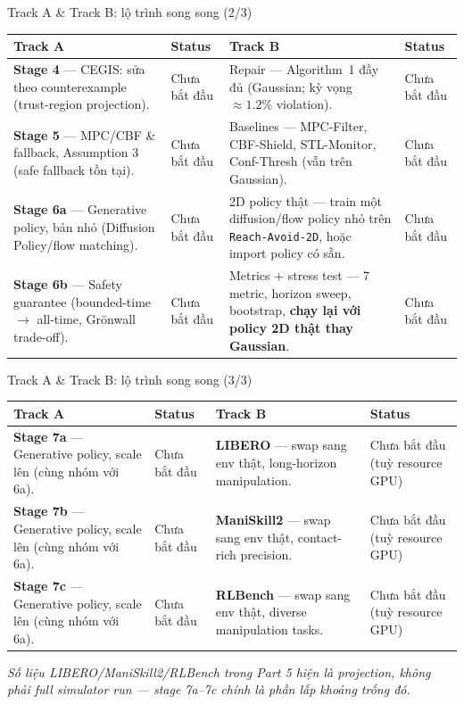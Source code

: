\documentclass[aspectratio=169]{beamer}
\begin{document}
\begin{frame}[t,shrink=8]{Track A \& Track B: lộ trình song song (2/3)}
\footnotesize
\begin{tabularx}{\textwidth}{|>{\raggedright\arraybackslash}p{}|>{\centering\arraybackslash}p{}|>{\raggedright\arraybackslash}p{}|>{\centering\arraybackslash}p{}|}
\hline
\textbf{Track A} & \textbf{Status} & \textbf{Track B} & \textbf{Status} \\
\hline
\textbf{Stage 4} --- CEGIS: sửa theo counterexample (trust-region projection). &
Chưa bắt đầu &
Repair --- Algorithm~1 đầy đủ (Gaussian; kỳ vọng $\approx1.2\%$ violation). &
Chưa bắt đầu \\
\hline
\textbf{Stage 5} --- MPC/CBF \& fallback, Assumption 3 (safe fallback tồn tại). &
Chưa bắt đầu &
Baselines --- MPC-Filter, CBF-Shield, STL-Monitor, Conf-Thresh (vẫn trên Gaussian). &
Chưa bắt đầu \\
\hline
\textbf{Stage 6a} --- Generative policy, bản nhỏ (Diffusion Policy/flow matching). &
Chưa bắt đầu &
2D policy thật --- train một diffusion/flow policy nhỏ trên \texttt{Reach-Avoid-2D}, hoặc import policy có sẵn. &
Chưa bắt đầu \\
\hline
\textbf{Stage 6b} --- Safety guarantee (bounded-time $\to$ all-time, Grönwall trade-off). &
Chưa bắt đầu &
Metrics + stress test --- 7 metric, horizon sweep, bootstrap, \textbf{chạy lại với policy 2D thật thay Gaussian}. &
Chưa bắt đầu \\
\hline
\end{tabularx}
\end{frame}

\begin{frame}[t,shrink=8]{Track A \& Track B: lộ trình song song (3/3)}
\footnotesize
\begin{tabularx}{\textwidth}{|>{\raggedright\arraybackslash}p{}|>{\centering\arraybackslash}p{}|>{\raggedright\arraybackslash}p{}|>{\centering\arraybackslash}p{}|}
\hline
\textbf{Track A} & \textbf{Status} & \textbf{Track B} & \textbf{Status} \\
\hline
\textbf{Stage 7a} --- Generative policy, scale lên (cùng nhóm với 6a). &
Chưa bắt đầu &
\textbf{LIBERO} --- swap sang env thật, long-horizon manipulation. &
Chưa bắt đầu (tuỳ resource GPU) \\
\hline
\textbf{Stage 7b} --- Generative policy, scale lên (cùng nhóm với 6a). &
Chưa bắt đầu &
\textbf{ManiSkill2} --- swap sang env thật, contact-rich precision. &
Chưa bắt đầu (tuỳ resource GPU) \\
\hline
\textbf{Stage 7c} --- Generative policy, scale lên (cùng nhóm với 6a). &
Chưa bắt đầu &
\textbf{RLBench} --- swap sang env thật, diverse manipulation tasks. &
Chưa bắt đầu (tuỳ resource GPU) \\
\hline
\end{tabularx}
\vspace{4pt}
\footnotesize\textit{Số liệu LIBERO/ManiSkill2/RLBench trong Part 5 hiện là projection, không phải full simulator run --- stage 7a--7c chính là phần lấp khoảng trống đó.}
\end{frame}
\end{document}
